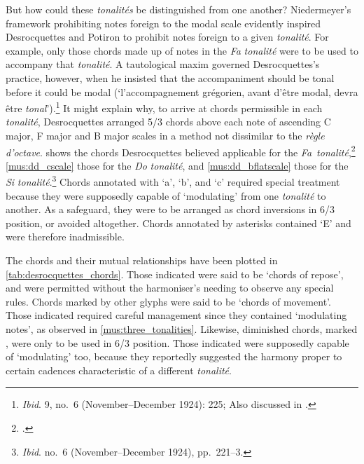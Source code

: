 %
But how could these \emph{tonalités} be distinguished from one another?
Niedermeyer's framework prohibiting notes foreign to the modal scale evidently inspired Desrocquettes and Potiron to prohibit notes foreign to a given \emph{tonalité}.
For example, only those chords made up of notes in the \emph{Fa} \emph{tonalité} were to be used to accompany that \emph{tonalité}.
A tautological maxim governed Desrocquettes's practice, however, when he insisted that the accompaniment should be tonal before it could be modal (`l'accompagnement grégorien, avant d'être modal, devra être \emph{tonal}').\footnote{\emph{Ibid}. 9, no.~6 (November--December 1924): 225; Also discussed in \cite[368]{Lessmannanachronismemusicalaccompagnement2019}.}
It might explain why, to arrive at chords permissible in each \emph{tonalité}, Desrocquettes arranged 5/3 chords above each note of ascending C major, F major and B\kern 1pt\flat{} major scales in a method not dissimilar to the \emph{règle d'octave}.
 shows the chords Desrocquettes believed applicable for the \emph{Fa}~\emph{tonalité},\footcite[130]{Desrocquettesaccompagnementmelodiegregorienne1924b} \cref{mus:dd_cscale} those for the \emph{Do} \emph{tonalité}, and \cref{mus:dd_bflatscale} those for the \emph{Si}\kern 1pt\flat{} \emph{tonalité}.\footnote{\emph{Ibid}. no.~6 (November--December 1924), pp.~221--3.}
\nocite{Desrocquettesaccompagnementmelodiegregorienne1924a}%
Chords annotated with `a', `b', and `c' required special treatment because they were supposedly capable of `modulating' from one \emph{tonalité} to another.
As a safeguard, they were to be arranged as chord inversions in 6/3 position, or avoided altogether.
Chords annotated by asterisks contained `E'\kern 1pt\flat{} and were therefore inadmissible.

The chords and their mutual relationships have been plotted in \cref{tab:desrocquettes_chords}.
Those indicated \bullet{} were said to be `chords of repose', and were permitted without the harmoniser's needing to observe any special rules.
Chords marked by other glyphs were said to be `chords of movement'.
Those indicated \times{} required careful management since they contained `modulating notes', as observed in \cref{mus:three_tonalities}.
Likewise, diminished chords, marked \circ{}, were only to be used in 6/3 position.
Those indicated \diamond{} were supposedly capable of `modulating' too, because they reportedly suggested the harmony proper to certain cadences characteristic of a different \emph{tonalité}.

